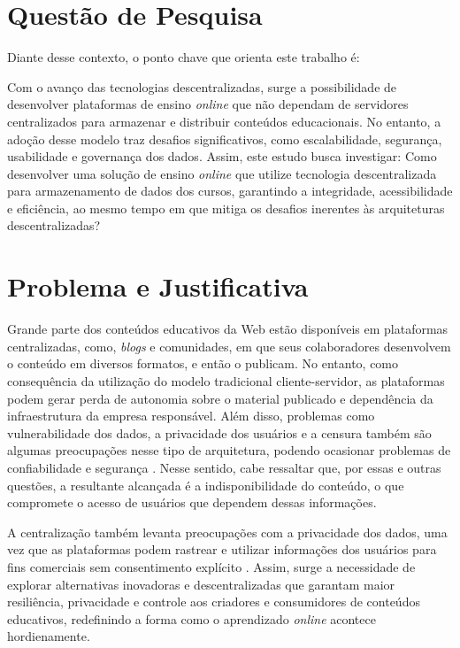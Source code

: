 \section{Questão de Pesquisa}
Diante desse contexto, o ponto chave que orienta este trabalho é:

Com o avanço das tecnologias descentralizadas, surge a possibilidade de desenvolver plataformas de ensino \textit{online} que não dependam de servidores centralizados para armazenar e distribuir conteúdos educacionais. No entanto, a adoção desse modelo traz desafios significativos, como escalabilidade, segurança, usabilidade e governança dos dados. Assim, este estudo busca investigar: Como desenvolver uma solução de ensino \textit{online} que utilize tecnologia descentralizada para armazenamento de dados dos cursos, garantindo a integridade, acessibilidade e eficiência, ao mesmo tempo em que mitiga os desafios inerentes às arquiteturas descentralizadas?

\section{Problema e Justificativa}

Grande parte dos conteúdos educativos da Web estão disponíveis em plataformas centralizadas, como, \textit{blogs} e comunidades, em que seus colaboradores desenvolvem o conteúdo em diversos formatos, e então o publicam. No entanto, como consequência da utilização do modelo tradicional cliente-servidor, as plataformas podem gerar perda de autonomia sobre o material publicado e dependência da infraestrutura da empresa responsável. Além disso, problemas como vulnerabilidade dos dados, a privacidade dos usuários e a censura também são algumas preocupações nesse tipo de arquitetura, podendo ocasionar problemas de confiabilidade e segurança \cite{wanner2024}. Nesse sentido, cabe ressaltar que, por essas e outras questões, a resultante alcançada é a indisponibilidade do conteúdo, o que compromete o acesso de usuários que dependem dessas informações. 

A centralização também levanta preocupações com a privacidade dos dados, uma vez que as plataformas podem rastrear e utilizar informações dos usuários para fins comerciais sem consentimento explícito \cite{beiro2020}. Assim, surge a necessidade de explorar alternativas inovadoras e descentralizadas que garantam maior resiliência, privacidade e controle aos criadores e consumidores de conteúdos educativos, redefinindo a forma como o aprendizado \textit{online} acontece hordienamente.

